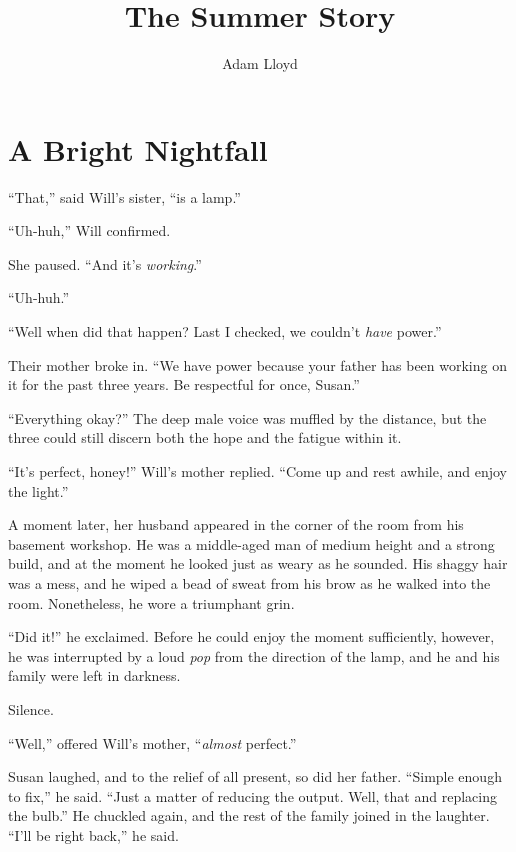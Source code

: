 \documentclass[12pt,letterpaper,oneside,english]{book}
\begin{document}
\title{The Summer Story}


\author{Adam Lloyd}

\maketitle
\tableofcontents{}


\chapter{A Bright Nightfall}

``That,'' said Will's sister, ``is a lamp.''

``Uh-huh,'' Will confirmed.

She paused. ``And it's \emph{working}.''

``Uh-huh.''

``Well when did that happen? Last I checked, we couldn't \emph{have}
power.''

Their mother broke in. ``We have power because your father has
been working on it for the past three years. Be respectful for once,
Susan.''

``Everything okay?'' The deep male voice was muffled by the distance,
but the three could still discern both the hope and the fatigue within
it.

``It's perfect, honey!'' Will's mother replied. ``Come up and
rest awhile, and enjoy the light.''

A moment later, her husband appeared in the corner of the room from
his basement workshop. He was a middle-aged man of medium height and
a strong build, and at the moment he looked just as weary as he sounded.
His shaggy hair was a mess, and he wiped a bead of sweat from his
brow as he walked into the room. Nonetheless, he wore a triumphant
grin.

``Did it!'' he exclaimed. Before he could enjoy the moment sufficiently,
however, he was interrupted by a loud \emph{pop} from the direction of
the lamp, and he and his family were left in darkness.

Silence.

``Well,'' offered Will's mother, ``\emph{almost} perfect.''

Susan laughed, and to the relief of all present, so did her father.
``Simple enough to fix,'' he said. ``Just a matter of reducing the
output. Well, that and replacing the bulb.'' He chuckled again, and the
rest of the family joined in the laughter. ``I'll be right back,'' he
said.
\end{document}
